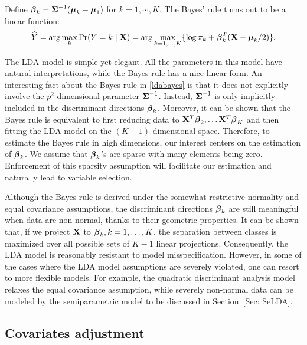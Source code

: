 Define $\boldsymbol{\beta}_k=\boldsymbol{\Sigma}^{-1}(\boldsymbol{\mu}_k-\boldsymbol{\mu}_1)$ for $k=1,\cdots,K$. The Bayes' rule turns out to be a linear function:  
\begin{equation}\label{ldabayes}
\widehat{Y}=\arg\max_{k}\mathrm{Pr}(Y=k\mid\mathbf{X})=\arg\max_{k=1,\dots,K}\{\log\pi_{k}+\boldsymbol{\beta}_k^T(\mathbf{X}-\boldsymbol{\mu}_k/2)\}.
\end{equation}

The LDA model is simple yet elegant. All the parameters in this model have natural interpretations, while the Bayes rule has a nice linear form. An interesting fact about the Bayes rule in \eqref{ldabayes} is that it does not explicitly involve the $p^2$-dimensional parameter $\boldsymbol{\Sigma}^{-1}$. Instead, $\boldsymbol{\Sigma}^{-1}$ is only implicitly included in the discriminant directions $\boldsymbol{\beta}_k$. Moreover, it can be shown that the Bayes rule is equivalent to first reducing data to $\mathbf{X}^T\boldsymbol{\beta}_2,\ldots\mathbf{X}^T\boldsymbol{\beta}_K$ and then fitting the LDA model on the $(K-1)$-dimensional space. Therefore, to estimate the Bayes rule in high dimensions, our interest centers on the estimation of $\boldsymbol{\beta}_k$. We assume that $\boldsymbol{\beta}_k$'s are sparse with many elements being zero. Enforcement of this sparsity assumption will facilitate our estimation and naturally lead to variable selection.

Although the Bayes rule is derived under the somewhat restrictive normality and equal covariance assumptions, the discriminant directions $\boldsymbol{\beta}_k$ are still meaningful when data are non-normal, thanks to their geometric properties. It can be shown that, if we project $\mathbf{X}$ to $\boldsymbol{\beta}_k,k=1,\ldots,K$, the separation between classes is maximized over all possible sets of $K-1$ linear projections. Consequently, the LDA model is reasonably resistant to model misspecification. However, in some of the cases where the LDA model assumptions are severely violated, one can resort to more flexible models. For example, the quadratic discriminant analysis model \citep{jiang2015quda, fan2015quadro, LiandShao2015, Sun2015} relaxes the equal covariance assumption, while severely non-normal data can be modeled by the semiparametric model to be discussed in Section~\ref{Sec: SeLDA}.







\subsection{Covariates adjustment}\label{Sec:CA}


